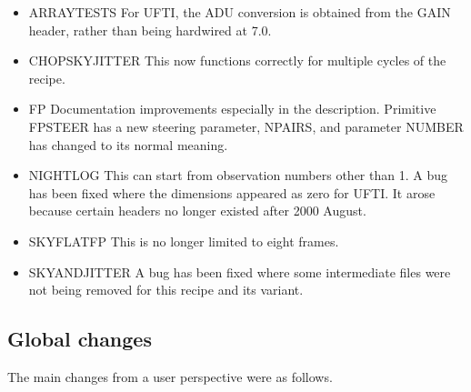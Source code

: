 \documentclass[twoside,11pt]{article}
\newcommand{\htmlref}[2]{#1}
\renewcommand{\_}{\texttt{\symbol{95}}}
\begin{document}
\begin{itemize}
    \item \htmlref{ARRAY\_TESTS}{ARRAY\_TESTS}
       For UFTI, the ADU conversion is obtained from the GAIN header,
       rather than being hardwired at 7.0.
    \item \htmlref{CHOP\_SKY\_JITTER}{CHOP\_SKY\_JITTER}
       This now functions correctly for multiple cycles of the recipe.
    \item \htmlref{FP}{FP}
       Documentation improvements especially in the description.
       Primitive \_FP\_STEER\_ has a new steering parameter, NPAIRS,
       and parameter NUMBER has changed to its normal meaning.
    \item \htmlref{NIGHT\_LOG}{NIGHT\_LOG}
       This can start from observation numbers other than 1.  A bug
       has been fixed where the dimensions appeared as zero for UFTI.
       It arose because certain headers no longer existed after 2000
       August.
    \item \htmlref{SKY\_FLAT\_FP}{SKY\_FLAT\_FP}
       This is no longer limited to eight frames.
    \item \htmlref{SKY\_AND\_JITTER}{SKY\_AND\_JITTER}
       A bug has been fixed where some intermediate files were not being
       removed for this recipe and its variant.
\end{itemize}

\subsection{Global changes}

The main changes from a user perspective were as follows.
\end{document}
